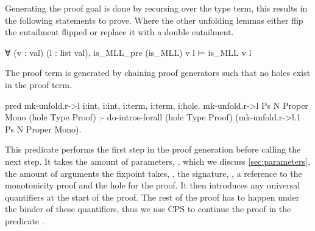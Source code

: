 \documentclass[thesis.tex]{subfiles}
\begin{document}
Generating the proof goal is done by recursing over the type term, this results in the following statements to prove. Where the other unfolding lemmas either flip the entailment flipped or replace it with a double entailment.
\begin{coqcode}
  ∀ (v : val) (l : list val),
      is_MLL_pre (is_MLL) v l 
    ⊢ is_MLL v l
\end{coqcode}

The proof term is generated by chaining proof generators such that no holes exist in the proof term.
\begin{elpicode}
  pred mk-unfold.r->l i:int, i:int, 
                      i:term, i:term, i:hole.
  mk-unfold.r->l Ps N Proper Mono (hole Type Proof) :-
    do-intros-forall (hole Type Proof) 
                     (mk-unfold.r->l.1 Ps N Proper Mono).
\end{elpicode}
This predicate performs the first step in the proof generation before calling the next step. It takes the amount of parameters, , which we discuss \cref{sec:parameters}, the amount of arguments the fixpoint takes, , the  signature, , a reference to the monotonicity proof  and the hole for the proof. It then introduces any universal quantifiers at the start of the proof. The rest of the proof has to happen under the binder of these quantifiers, thus we use CPS to continue the proof in the predicate .
\end{document}
